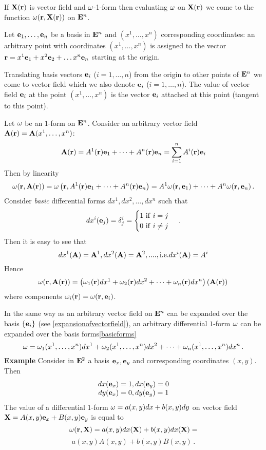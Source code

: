\documentclass[12pt]{article}
\numberwithin{equation}{section}
\begin{document}
If ${\bf X}({\bf r})$ is vector field and ${\omega}$-1-form then evaluating ${\omega}$ on ${\bf X}({\bf r})$ we come to the function
${\omega}({\bf r},{\bf X}({\bf r}))$  on ${\bf E}^n$.


 Let ${{\bf e}_1,\dots,{\bf e}_n}$ be a basis in ${\bf E}^n$ and $(x^1,\dots,x^n)$ corresponding coordinates:
 an arbitrary point with coordinates $(x^1,\dots,x^n)$ is assigned to the vector
 ${\bf r}=x^1{\bf e}_1+x^2{\bf e}_2+\dots x^n{\bf e}_n$ starting at the origin.

Translating basis vectors  ${\bf e}_i$ ($i=1,\dots,n$)
from the origin to other points of ${\bf E}^n$ we come to vector field which we also denote ${\bf e}_i$ ($i=1,\dots,n$).
 The value of vector field ${\bf e}_i$ at the point $(x^1,\dots,x^n)$ is the vector
 ${\bf e}_i$ attached at this point (tangent to this point).




   Let ${\omega}$ be an $1$-form on ${\bf E}^n$.
   Consider an arbitrary  vector field ${\bf A}({\bf r})={\bf A}(x^1,\dots,x^n)$:
 \begin{equation*}\label{expansionofvectorfield}
    {\bf A}({\bf r})= A^1({\bf r}){\bf e}_1+\dots+A^n({\bf r}){\bf e}_n=\sum_{i=1}^nA^i({\bf r}){\bf e}_i
      \end{equation*}
 Then by linearity
           $$
    {\omega}({\bf r},{\bf A}({\bf r}))={\omega}\left(
  {\bf r}, A^1({\bf r}){\bf e}_1+\dots+A^n({\bf r}){\bf e}_n\right)=
    A^1{\omega}({\bf r},{\bf e}_1)+\dots+A^n{\omega}({\bf r},{\bf e}_n)\,.
           $$
Consider {\it basic} differential forms $dx^1,dx^2,\dots,dx^n$ such that
                 \begin{equation}\label{basicforms}
    dx^i({\bf e}_j)=\delta^i_j=\begin{cases}
     1\,\,{\rm if}\,\, i=j\cr 0\,\,{\rm if}\,\, i\not =j\cr
      \end{cases}\,.
\end{equation}
Then it is easy to see that
                 $$
  dx^1 ({\bf A})={\bf A}^1,dx^2 ({\bf A})={\bf A}^2,....,{\rm i.e.} dx^i({\bf A})=A^i
                 $$
Hence
              $$
   {\omega}({\bf r},{\bf A}({\bf r}))=\left({\omega}_1({\bf r})dx^1+{\omega}_2({\bf r})dx^2+\dots+{\omega}_n({\bf r})dx^n\right)({\bf A}({\bf r}))\,
              $$
where components ${\omega}_i({\bf r})={\omega}({\bf r},{\bf e}_i)$.

  {\footnotesize 
In the same way as an arbitrary  vector field on ${\bf E}^n$ can be expanded over the basis $\{{\bf e}_i\}$
  (see \eqref{expansionofvectorfield}),
  an arbitrary differential $1$-form ${\omega}$ can be expanded over the basis forms\eqref{basicforms}
   $$
   {\omega}={\omega}_1(x^1,\dots,x^n)dx^1+{\omega}_2(x^1,\dots,x^n)dx^2+\dots+{\omega}_n(x^1,\dots,x^n)dx^n\,.
     $$
}
\m
 {\bf Example} Consider in ${\bf E}^2$ a basis ${\bf e}_x,{\bf e}_y$
 and corresponding coordinates $(x,y)$.
  Then
\begin{equation}\label{cartesianbasisinthree}
      \begin{matrix}
    dx({\bf e}_x)=1, dx({\bf e}_y)=0 \cr
    dy({\bf e}_x)=0, dy({\bf e}_y)=1 \cr
    \end{matrix}
\end{equation}
The value of a differential $1$-form
${\omega}=a(x,y)dx+b(x,y)dy$  on vector field
${\bf X}=A(x,y){\bf e}_x+B(x,y){\bf e}_y$ is equal to
               $$
   {\omega}({\bf r}, {\bf X})=a(x,y)dx({\bf X})+b(x,y)dx({\bf X})=
           $$
           $$
  a(x,y)A(x,y)+b(x,y)B(x,y)\,.
               $$
\end{document}
